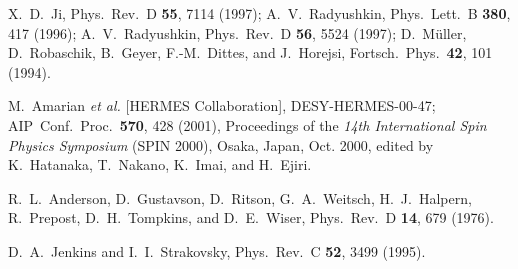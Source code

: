 \documentclass[aps,prc,twocolumn,floatfix,showpacs,preprintnumbers,amsmath,amssymb,superscriptaddress,linenumbers]{revtex4-1}
\begin{document}
\begin{thebibliography}{99}
  X.~D.~Ji,
  Phys.\ Rev.\ D {\bf 55}, 7114 (1997);
  A.~V.~Radyushkin,
  Phys.\ Lett.\ B {\bf 380}, 417 (1996);
  A.~V.~Radyushkin,
  Phys.\ Rev.\ D {\bf 56}, 5524 (1997);
  D.~M\"uller, D.~Robaschik, B.~Geyer, F.-M.~Dittes, and J.~Horejsi,
  Fortsch.\ Phys.\  {\bf 42}, 101 (1994).

  M.~Amarian {\it et al.} [HERMES Collaboration],
  DESY-HERMES-00-47;
  AIP\ Conf.\ Proc.\ \textbf{570}, 428 (2001), Proceedings of the \textit{14th 
  International Spin Physics Symposium} (SPIN 2000), Osaka, Japan, Oct. 2000, 
  edited by K.~Hatanaka, T.~Nakano, K.~Imai, and H.~Ejiri.

  R.~L.~Anderson, D.~Gustavson, D.~Ritson, G.~A.~Weitsch, H.~J.~Halpern, R.~Prepost, D.~H.~Tompkins, and D.~E.~Wiser,
  Phys.\ Rev.\ D {\bf 14}, 679 (1976).

  D.~A.~Jenkins and I.~I.~Strakovsky,
  Phys.\ Rev.\ C {\bf 52}, 3499 (1995).


\end{thebibliography}
\end{document}

